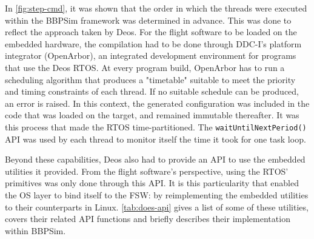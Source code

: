 {In \autoref{fig:step-cmd}, it was shown that the order in which the threads were executed within the \gls{BBPSim} framework was determined in advance. This was done to reflect the approach taken by Deos. For the flight software to be loaded on the embedded hardware, the compilation had to be done through DDC-I's platform integrator (OpenArbor), an integrated development environment for programs that use the Deos RTOS. At every program build, OpenArbor has to run a scheduling algorithm that produces a "timetable" suitable to meet the priority and timing constraints of each thread. If no suitable schedule can be produced, an error is raised. In this context, the generated configuration was included in the code that was loaded on the target, and remained immutable thereafter. It was this process that made the RTOS time-partitioned. The \texttt{waitUntilNextPeriod()} API was used by each thread to monitor itself the time it took for one task loop. 

Beyond these capabilities, Deos also had to provide an API to use the embedded utilities it provided. From the flight software's perspective, using the RTOS' primitives was only done through this API. It is this particularity that enabled the OS layer to bind itself to the FSW: by reimplementing the embedded utilities to their counterparts in Linux. \autoref{tab:does-api} gives a list of some of these utilities, covers their related API functions and briefly describes their implementation within \gls{BBPSim}. 

}
